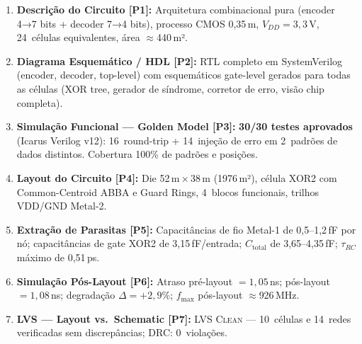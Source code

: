 \documentclass[12pt,a4paper]{article}
\begin{document}
\begin{enumerate}[leftmargin=2em,label=\textbf{\arabic*.}]
  \item \textbf{Descrição do Circuito [P1]:} Arquitetura combinacional pura (encoder 4→7 bits + decoder 7→4 bits), processo CMOS 0,35\,\textmu m, $V_{DD} = 3{,}3$\,V, 24~células equivalentes, área $\approx$440\,\textmu m².

  \item \textbf{Diagrama Esquemático / HDL [P2]:} RTL completo em SystemVerilog (encoder, decoder, top-level) com esquemáticos gate-level gerados para todas as células (XOR tree, gerador de síndrome, corretor de erro, visão chip completa).

  \item \textbf{Simulação Funcional --- Golden Model [P3]:} \textbf{30/30 testes aprovados} (Icarus Verilog v12): 16~round-trip + 14~injeção de erro em 2~padrões de dados distintos. Cobertura 100\% de padrões e posições.

  \item \textbf{Layout do Circuito [P4]:} Die 52\,\textmu m\,$\times$\,38\,\textmu m (1976\,\textmu m²), célula XOR2 com Common-Centroid ABBA e Guard Rings, 4~blocos funcionais, trilhos VDD/GND Metal-2.

  \item \textbf{Extração de Parasitas [P5]:} Capacitâncias de fio Metal-1 de 0,5--1,2\,fF por nó; capacitâncias de gate XOR2 de 3,15\,fF/entrada; $C_{\text{total}}$ de 3,65--4,35\,fF; $\tau_{RC}$ máximo de 0,51\,ps.

  \item \textbf{Simulação Pós-Layout [P6]:} Atraso pré-layout $= 1{,}05$\,ns; pós-layout $= 1{,}08$\,ns; degradação $\Delta = +2{,}9\%$; $f_{\max}$ pós-layout $\approx$926\,MHz.

  \item \textbf{LVS --- Layout vs.\ Schematic [P7]:} \textsc{LVS Clean} --- 10~células e 14~redes verificadas sem discrepâncias; DRC: 0~violações.
\end{enumerate}
\end{document}
